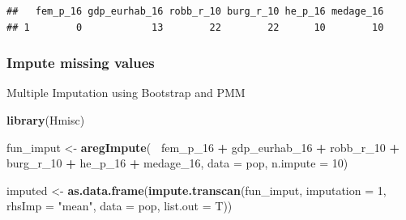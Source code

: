 \documentclass[
]{article}
\newenvironment{Shaded}{\begin{snugshade}}{\end{snugshade}}
\newcommand{\DataTypeTok}[1]{\textcolor[rgb]{0.13,0.29,0.53}{#1}}
\newcommand{\DecValTok}[1]{\textcolor[rgb]{0.00,0.00,0.81}{#1}}
\newcommand{\KeywordTok}[1]{\textcolor[rgb]{0.13,0.29,0.53}{\textbf{#1}}}
\newcommand{\NormalTok}[1]{#1}
\newcommand{\OperatorTok}[1]{\textcolor[rgb]{0.81,0.36,0.00}{\textbf{#1}}}
\newcommand{\StringTok}[1]{\textcolor[rgb]{0.31,0.60,0.02}{#1}}
\begin{document}
\begin{verbatim}
##   fem_p_16 gdp_eurhab_16 robb_r_10 burg_r_10 he_p_16 medage_16
## 1        0            13        22        22      10        10
\end{verbatim}

\hypertarget{impute-missing-values}{%
\subsubsection{Impute missing values}\label{impute-missing-values}}

Multiple Imputation using Bootstrap and PMM

\begin{Shaded}
\begin{Highlighting}[]
\KeywordTok{library}\NormalTok{(Hmisc)}

\NormalTok{fun_imput <-}\StringTok{ }\KeywordTok{aregImpute}\NormalTok{(}\OperatorTok{~}\StringTok{ }\NormalTok{fem_p_}\DecValTok{16} \OperatorTok{+}\StringTok{ }\NormalTok{gdp_eurhab_}\DecValTok{16} \OperatorTok{+}\StringTok{ }\NormalTok{robb_r_}\DecValTok{10} \OperatorTok{+}\StringTok{ }\NormalTok{burg_r_}\DecValTok{10} \OperatorTok{+}\StringTok{ }\NormalTok{he_p_}\DecValTok{16} \OperatorTok{+}\StringTok{ }\NormalTok{medage_}\DecValTok{16}\NormalTok{, }
                  \DataTypeTok{data =}\NormalTok{ pop, }\DataTypeTok{n.impute =} \DecValTok{10}\NormalTok{)}
\end{Highlighting}
\end{Shaded}

\begin{Shaded}
\begin{Highlighting}[]
\NormalTok{imputed <-}\StringTok{ }\KeywordTok{as.data.frame}\NormalTok{(}\KeywordTok{impute.transcan}\NormalTok{(fun_imput, }
                                         \DataTypeTok{imputation =} \DecValTok{1}\NormalTok{, }
                                         \DataTypeTok{rhsImp =} \StringTok{"mean"}\NormalTok{, }
                                         \DataTypeTok{data =}\NormalTok{ pop, }
                                         \DataTypeTok{list.out =}\NormalTok{ T))}
\end{Highlighting}
\end{Shaded}

\begin{Shaded}
\end{Shaded}
\end{document}
